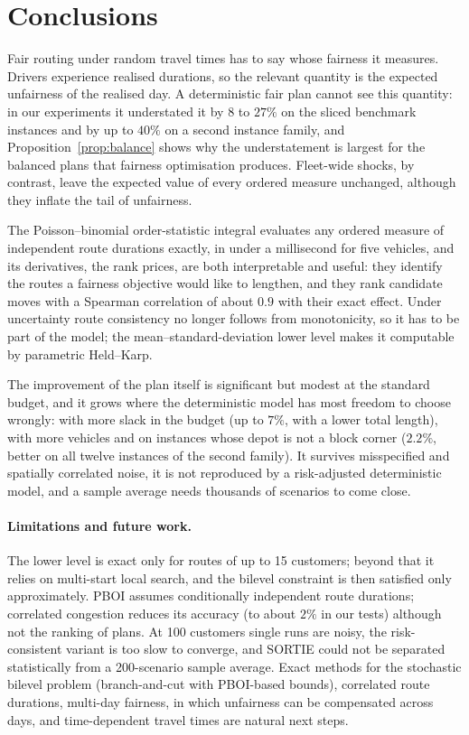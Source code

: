 \documentclass[11pt]{article}
\theoremstyle{definition}
\begin{document}
\section{Conclusions}\label{sec:concl}
Fair routing under random travel times has to say whose fairness it measures.
Drivers experience realised durations, so the relevant quantity is the
expected unfairness of the realised day. A deterministic fair plan cannot see
this quantity: in our experiments it understated it by $8$ to $27\%$ on the
sliced benchmark instances and by up to $40\%$ on a second instance family, and
Proposition~\ref{prop:balance} shows why the understatement is largest for the
balanced plans that fairness optimisation produces. Fleet-wide shocks, by
contrast, leave the expected value of every ordered measure unchanged, although
they inflate the tail of unfairness.

The Poisson--binomial order-statistic integral evaluates any ordered measure of
independent route durations exactly, in under a millisecond for five vehicles,
and its derivatives, the rank prices, are both interpretable and useful: they
identify the routes a fairness objective would like to lengthen, and they rank
candidate moves with a Spearman correlation of about $0.9$ with their exact
effect. Under uncertainty route consistency no longer follows from
monotonicity, so it has to be part of the model; the mean--standard-deviation
lower level makes it computable by parametric Held--Karp.

The improvement of the plan itself is significant but modest at the standard
budget, and it grows where the deterministic model has most freedom to choose
wrongly: with more slack in the budget (up to $7\%$, with a lower total
length), with more vehicles and on instances whose depot is not a block corner
($2.2\%$, better on all twelve instances of the second family). It survives
misspecified and spatially correlated noise, it is not reproduced by a
risk-adjusted deterministic model, and a sample average needs thousands of
scenarios to come close.

\paragraph{Limitations and future work.} The lower level is exact only for
routes of up to 15 customers; beyond that it relies on multi-start local
search, and the bilevel constraint is then satisfied only approximately. PBOI
assumes conditionally independent route durations; correlated congestion
reduces its accuracy (to about $2\%$ in our tests) although not the ranking of
plans. At 100 customers single runs are noisy, the risk-consistent variant is
too slow to converge, and SORTIE could not be separated statistically from a
200-scenario sample average. Exact methods for the stochastic bilevel problem
(branch-and-cut with PBOI-based bounds), correlated route durations, multi-day
fairness, in which unfairness can be compensated across days, and
time-dependent travel times are natural next steps.
\end{document}
